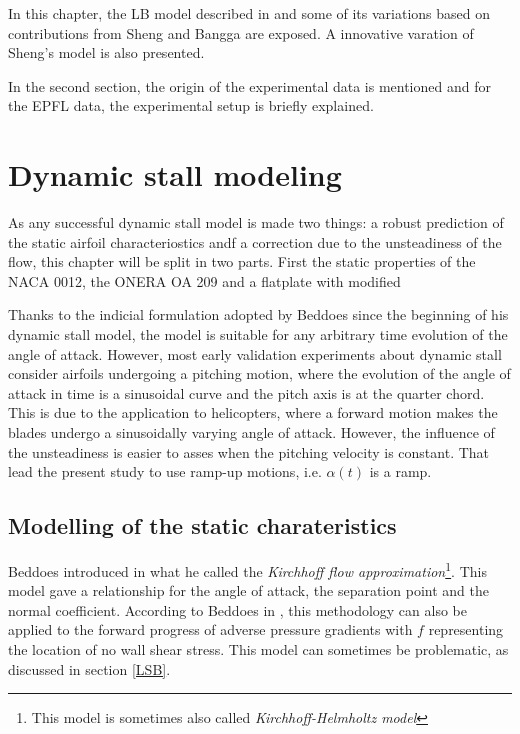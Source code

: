 In this chapter, the LB model described in \cite{leishman_semi-empirical} and some of its variations based on contributions from Sheng \cite{sheng_modified_2008} and Bangga \cite{bangga_improved_2020} are exposed. A innovative varation of Sheng's model is also presented. 

In the second section, the origin of the experimental data is mentioned and for the EPFL data, the experimental setup is briefly explained.

\section{Dynamic stall modeling}

As any successful dynamic stall model is made two things: a robust prediction of the static airfoil characteriostics andf a correction due to the unsteadiness of the flow, this chapter will be split in two parts. First the static properties of the NACA 0012, the ONERA OA 209 and a flatplate with modified 

Thanks to the indicial formulation adopted by Beddoes since the beginning of his dynamic stall model, the model is suitable for any arbitrary time evolution of the angle of attack. However, most early validation experiments about dynamic stall consider airfoils undergoing a pitching motion, where the evolution of the angle of attack in time is a sinusoidal curve and the pitch axis is at the quarter chord. This is due to the application to helicopters, where a forward motion makes the blades undergo a sinusoidally varying angle of attack. However, the influence of the unsteadiness is easier to asses when the pitching velocity is constant. That lead the present study to use ramp-up motions, i.e. $\alpha(t)$ is a ramp.


\subsection{Modelling of the static charateristics}
\label{section:kirchhoff}

Beddoes introduced in \cite{beddoes_representation_1983} what he called the \textit{Kirchhoff flow approximation}\footnote{This model is sometimes also called \textit{Kirchhoff-Helmholtz model}}. This model gave a relationship for the angle of attack, the separation point and the normal coefficient. According to Beddoes in \cite{beddoes_representation_1983}, this methodology can also be applied to the forward progress of adverse pressure gradients with $f$ representing the location of no wall shear stress. This model can sometimes be problematic, as discussed in section \ref{LSB}.

